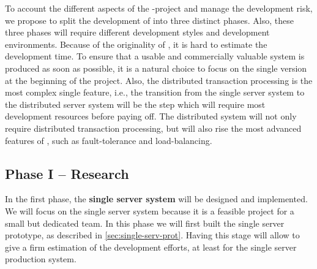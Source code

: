 \documentclass[a4paper, 10pt]{book}
\begin{document}
                                        To account the different aspects of the \SYNEIGHT-project and manage the
                                        development risk, we propose to split the development of \SYNEIGHT into
                                        three distinct phases. Also, these three phases will require different
                                        development styles and development environments. Because of the
                                        originality of \SYNEIGHT, it is hard to estimate the development
                                        time. To ensure that a usable and commercially valuable system is
                                        produced as soon as possible, it is a natural choice to focus on the
                                        single version at the beginning of the project. Also, the distributed
                                        transaction processing is the most complex single feature, i.e., the
                                        transition from the single server system to the distributed server
                                        system will be the step which will require most development resources
                                        before paying off. The distributed system will not only require
                                        distributed transaction processing, but will also rise the most
                                        advanced features of \SYNEIGHT, such as fault-tolerance and
                                        load-balancing. 


                                        \subsection{Phase I -- Research}

                                        In the first phase, the \textbf{single server system} will be designed
                                        and implemented. We will focus on the single server system because it
                                        is a feasible project for a small but dedicated team. In this phase we
                                        will first built the single server prototype, as described in
                                        \vref{sec:single-serv-prot}. Having this stage will allow to give a
                                        firm estimation of the development efforts, at least for the single
                                        server production system. 
\end{document}
